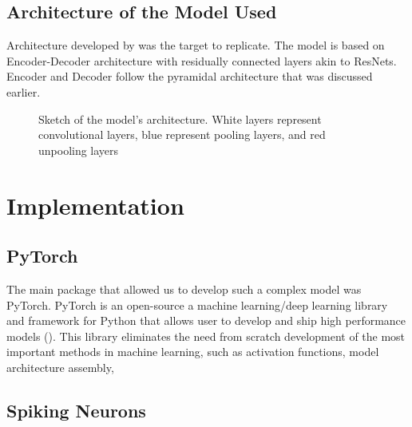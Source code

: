 \documentclass{article}
\begin{document}
\subsection{Architecture of the Model Used}


Architecture developed by  was the target to replicate. The model is based
on Encoder-Decoder architecture with residually connected layers akin to ResNets. Encoder and 
Decoder follow the pyramidal architecture that was discussed earlier. 

\begin{figure}[h]
	\begin{center}
	
	\end{center}
	\caption{Sketch of the model's architecture. White layers represent convolutional layers,
	blue represent pooling layers, and red unpooling layers}
\end{figure}




\section{Implementation}

\subsection{PyTorch}

The main package that allowed us to develop such a complex model was PyTorch. PyTorch
is an open-source a machine learning/deep learning library and framework for Python 
that allows user to develop and ship high performance models (). This library
eliminates the need from scratch development of the most important methods in machine learning,
such as activation functions, model architecture assembly, 


\subsection{Spiking Neurons}
\end{document}
